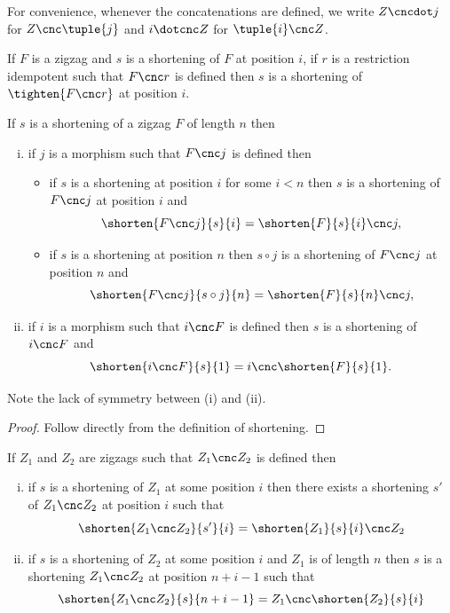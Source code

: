 For convenience, 
whenever the concatenations are defined, we write
$Z \cncdot j$ for $Z \cnc \tuple{j}$ and
$i \dotcnc Z$ for $\tuple{i} \cnc Z$.

\begin{corollary}
If $F$ is a zigzag and $s$ is a shortening of $F$ at position $i$,
if $r$ is a restriction idempotent such that $F \cnc r$ is defined
then $s$ is a shortening of $\tighten{F\cnc r}$ at position $i$.
\end{corollary}

\begin{lemma}
If $s$ is a shortening 
of a zigzag $F$  of length $n$
then
\begin{enumerate}[(i)]
\item
if $j$ is a morphism  such that $F \cnc j$  is defined then
\begin{itemize}
\item if $s$ is a shortening at position $i$ for some $i < n$ 
then $s$ is a shortening of $F \cnc j$ 
at position $i$ and
 \[
 \shorten{F \cnc j}{s}{i} 
                       = \shorten{F}{s}{i} \cnc j,
 \] 
\item
if $s$ is a shortening at position $n$
then $s \circ j$ is a shortening of $F \cnc j$ at position $n$
and
 \[
 \shorten{F \cnc j}{s \circ j}{n} 
                       = \shorten{F}{s}{n} \cnc j,
 \] 
\end{itemize}
 \item
 if $i$ is a morphism
 such that $i \cnc F$  is defined
 then $s$ is a shortening of $i \cnc F$ and
 \[
 \shorten{i \cnc F}{s}{1}
                        = i \cnc \shorten{F}{s}{1}.
 \] 
\end{enumerate}
Note the lack of symmetry between (i) and (ii). 
\end{lemma}
\begin{proof}
Follow directly from the definition of shortening.
\end{proof}

\begin{corollary}
If $Z_1$ and $Z_2$ are zigzags such that $Z_1 \cnc Z_2$ 
is defined then 
\begin{enumerate}[(i)]
\item %
if $s$ is a shortening of $Z_1$
at some position $i$
then there exists a shortening $s'$ of $Z_1 \cnc Z_2$
at position $i$ such that 
\[
\shorten{Z_1 \cnc Z_2}{s'}{i} = \shorten{Z_1}{s}{i} \cnc Z_2
\]
\item %
if $s$ is a shortening of $Z_2$
at some position $i$ and $Z_1$ is of length $n$
then $s$ is a shortening  $Z_1 \cnc Z_2$
at position $n + i -1$ such that 
\[
\shorten{Z_1 \cnc Z_2}{s}{n + i -1} = Z_1 \cnc \shorten{Z_2}{s}{i}
\]
\end{enumerate}
\end{corollary}

